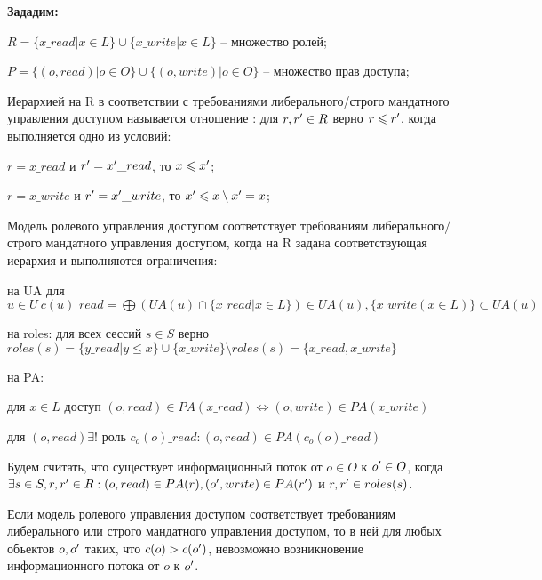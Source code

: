 \textbf{Зададим:}
\begin{enumerate*}
	\item $R = \{x\_read | x \in L\} \cup \{x\_write | x \in L\}$ -- множество ролей;
	\item $P = \{(o,read) | o \in O\} \cup \{(o,write) | o \in O\}$ -- множество прав доступа;
\end{enumerate*}


\begin{defs}[Иерархия на R]
	Иерархией на R в соответствии с требованиями либерального/строго мандатного управления доступом называется отношение \kav{$\leqslant$} : для $r, r^{\prime} \in R$ верно $r \leqslant r^{\prime}$, когда выполняется
	одно из условий:
		\begin{itemize*}
			\item $r = x\_read$ и $r^{\prime} = x^{\prime}\_read$, то $x \leqslant x^{\prime}$;
			\item $r = x\_write$ и $r^{\prime} = x^{\prime}\_write$, то $x^{\prime} \leqslant x \setminus x^{\prime} = x$;
		\end{itemize*}
\end{defs}

\begin{defs}
	Модель ролевого управления доступом соответствует требованиям либерального/строго мандатного управления доступом, когда на R задана соответствующая иерархия и выполняются ограничения:
		\begin{itemize*}
			\item на UA для $u \in U \ c(u)\_read = \bigoplus (UA(u) \cap \{x\_read | x \in L\}) \in UA(u), \{x\_write(x \in L)\} \subset UA(u)$
			\item на roles: для всех сессий $s \in S$ верно $roles(s) = \{y\_read | y \leqslant x\} \cup \{x\_write\} \setminus roles(s) = \{x\_read, x\_write\}$ 
			\item на PA:
				\begin{itemize*}
					\item для $x \in L$ доступ $(o, read) \in PA(x\_read) \Leftrightarrow (o,write) \in PA(x\_write)$
					\item для $(o,read) \exists!$ роль $c_o(o)\_read : (o, read) \in PA(c_o(o)\_read)$
				\end{itemize*}
		\end{itemize*}
\end{defs}

\begin{defs}
	Будем считать, что существует информационный поток от $o \in O$ к $o^{\prime} \in O$, когда $\exists s \in S, r, r^{\prime} \in R : (o, read) \in PA(r), (o^{\prime}, write) \in PA(r^{\prime})$ 
	и $r,r^{\prime} \in roles(s)$.
\end{defs}

\begin{proofs}
	Если модель ролевого управления доступом соответствует требованиям либерального или строго мандатного управления доступом, то в ней для любых объектов $o, o^{\prime}$ таких, что 
	$c(o) > c(o^{\prime})$, невозможно возникновение информационного потока от $o$ к $o^{\prime}$.
\end{proofs}

